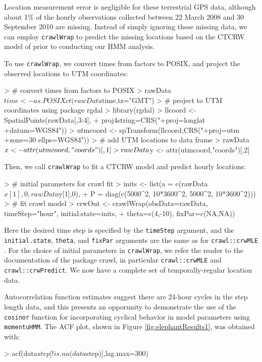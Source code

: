 \documentclass[12pt]{article}
\begin{document}
Location measurement error is negligible for these terrestrial GPS data, although about 1\% of the hourly observations collected between 22 March 2008 and 30 September 2010 are missing. Instead of simply ignoring these missing data, we can employ \verb|crawlWrap| to predict the missing locations based on the CTCRW model of \cite{JohnsonEtAl2008} prior to conducting our HMM analysis.

To use \verb|crawlWrap|, we convert times from factors to POSIX, and project the observed locations to UTM coordinates:
\begin{Schunk}
\begin{Sinput}
> # convert times from factors to POSIX
> rawData$time <- as.POSIXct(rawData$time,tz="GMT")
> # project to UTM coordinates using package rgdal
> library(rgdal)
> llcoord <- SpatialPoints(rawData[,3:4], 
+                          proj4string=CRS("+proj=longlat +datum=WGS84"))
> utmcoord <- spTransform(llcoord,CRS("+proj=utm +zone=30 ellps=WGS84"))
> # add UTM locations to data frame
> rawData$x <- attr(utmcoord,"coords")[,1]
> rawData$y <- attr(utmcoord,"coords")[,2]
\end{Sinput}
\end{Schunk}

Then, we call \verb|crawlWrap| to fit a CTCRW model and predict hourly locations:
\begin{Schunk}
\begin{Sinput}
> # initial parameters for crawl fit
> inits <- list(a = c(rawData$x[1],0,rawData$y[1],0),
+               P = diag(c(5000^2, 10*3600^2, 5000^2, 10*3600^2)))
> # fit crawl model
> crwOut <- crawlWrap(obsData=rawData, timeStep="hour", initial.state=inits,
+                     theta=c(4,-10), fixPar=c(NA,NA))
\end{Sinput}
\end{Schunk}

Here the desired time step is specified by the \verb|timeStep| argument, and the \verb|initial.state|, \verb|theta|, and \verb|fixPar| arguments are the same as for \verb|crawl::crwMLE| \citep{Johnson2017}. For the choice of initial parameters in \verb|crawlWrap|, we refer the reader to the documentation of the package crawl, in particular \verb|crawl::crwMLE| and \verb|crawl::crwPredict|. We now have a complete set of temporally-regular location data.

Autocorrelation function estimates suggest there are 24-hour cycles in the step length data, and this presents an opporunity to demonstrate the use of the \verb|cosinor| function for incorporating cyclical behavior in model parameters using \verb|momentuHMM|. The ACF plot, shown in Figure \ref{fig:elephantResults1}, was obtained with:
\begin{Schunk}
\begin{Sinput}
> acf(data$step[!is.na(data$step)],lag.max=300)
\end{Sinput}
\end{Schunk}
\end{document}
